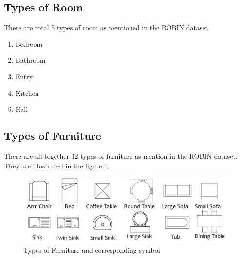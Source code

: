                 \subsection{Types of Room}
                        There are total 5 types of room as mentioned in the ROBIN dataset. 
                        \begin{enumerate}[label=\alph*.]
                                \item Bedroom
                                \item Bathroom
                                \item Entry
                                \item Kitchen
                                \item Hall
                        \end{enumerate}
                \subsection{Types of Furniture}
                        There are all together 12 types of furniture as mention in the ROBIN dataset. They are illustrated in the figure \ref{fig:Types of Furniture and corresponding symbol}.
                        \begin{figure}[h]
                                \centering
                                \includegraphics[width=.8\textwidth]{img/chapter_6/furniture_in_ROBIN.png}
                                \caption{Types of Furniture and corresponding symbol}
                                \label{fig:Types of Furniture and corresponding symbol}
                        \end{figure}                
